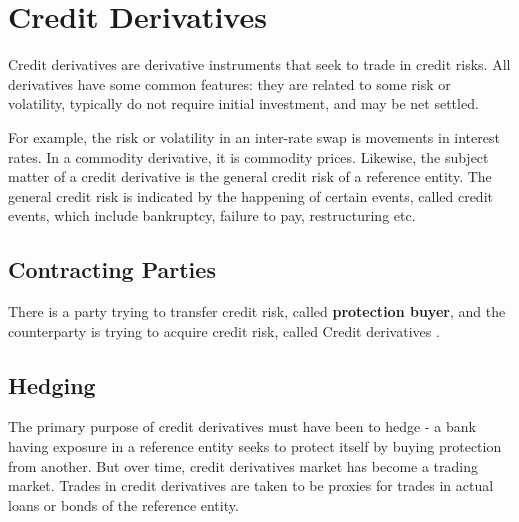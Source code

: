 \documentclass[]{article}
\begin{document}
\section{Credit Derivatives }

Credit derivatives are derivative instruments that seek to trade in credit risks. All derivatives have some common features: they are related to some risk or volatility, typically do not require initial investment, and may be net settled. 

For example, the risk or volatility in an inter-rate swap is movements in interest rates. In a commodity derivative, it is commodity prices. Likewise, the subject matter of a credit derivative is the general credit risk of a reference entity. The general credit risk is indicated by the happening of certain events, called credit events, which include bankruptcy, failure to pay, restructuring etc.

\subsection{Contracting Parties}There is a party trying to transfer credit risk, called \textbf{protection buyer}, and the counterparty is trying to acquire credit risk, called Credit derivatives .

\subsection{Hedging}
The primary purpose of credit derivatives must have been to hedge - a bank having exposure in a reference entity seeks to protect itself by buying protection from another. But over time, credit derivatives market has become a trading market. Trades in credit derivatives are taken to be proxies for trades in actual loans or bonds of the reference entity. 
\end{document}
